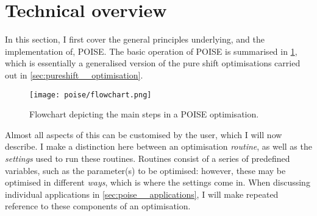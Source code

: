 \section{Technical overview}
\label{sec:poise__technical}

In this section, I first cover the general principles underlying, and the implementation of, POISE.
The basic operation of POISE is summarised in \cref{fig:poise_flowchart}, which is essentially a generalised version of the pure shift optimisations carried out in \cref{sec:pureshift__optimisation}.

\begin{figure}[htb]
    \centering
    \texttt{[image: poise/flowchart.png]}
    \caption[Flowchart for POISE optimisations]{Flowchart depicting the main steps in a POISE optimisation.}
    \label{fig:poise_flowchart}
\end{figure}

Almost all aspects of this can be customised by the user, which I will now describe.
I make a distinction here between an optimisation \textit{routine}, as well as the \textit{settings} used to run these routines.
Routines consist of a series of predefined variables, such as the parameter(s) to be optimised: however, these may be optimised in different \textit{ways}, which is where the settings come in.
When discussing individual applications in \cref{sec:poise__applications}, I will make repeated reference to these components of an optimisation.





